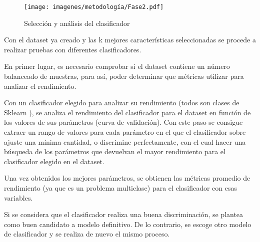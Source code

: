 \begin{figure}[H]
	\centering
	\captionsetup{justification=centering}
	\texttt{[image: imagenes/metodología/Fase2.pdf]}
	\caption{Selección y análisis del clasificador}
	\label{met:fase2}
\end{figure}

Con el dataset ya creado y las k mejores características seleccionadas se procede a realizar pruebas con diferentes clasificadores.

En primer lugar, es necesario comprobar si el dataset contiene un número balanceado de muestras, para así, poder determinar que métricas utilizar para analizar el rendimiento. 

Con un clasificador elegido para analizar su rendimiento (todos son clases de Sklearn \cite{sklearn_api}), se analiza el rendimiento del clasificador para el dataset en función de los valores de sus parámetros (curva de validación). Con este paso se consigue extraer un rango de valores para cada parámetro en el que el clasificador sobre ajuste una mínima cantidad, o discrimine perfectamente, con el cual hacer una búsqueda de los parámetros que devuelvan el mayor rendimiento para el clasificador elegido en el dataset.

Una vez obtenidos los mejores parámetros, se obtienen las métricas promedio de rendimiento (ya que es un problema multiclase) para el clasificador con esas variables. 

Si se considera que el clasificador realiza una buena discriminación, se plantea como buen candidato a modelo definitivo. De lo contrario, se escoge otro modelo de clasificador y se realiza de nuevo el mismo proceso.

